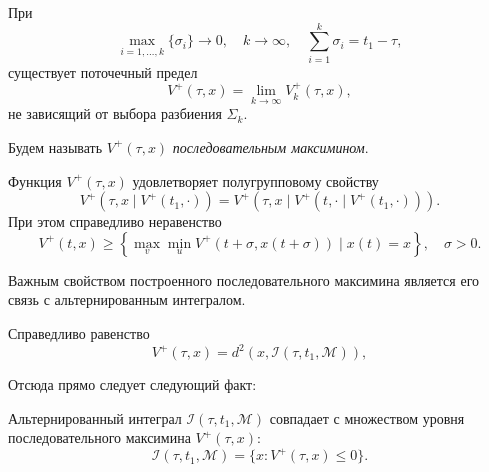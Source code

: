 \begin{lemma}
    При
    \begin{equation*}
        \max_{i = 1,\dots,k} \{\sigma_i\} \to 0, \quad k \to \infty, \quad \sum_{i = 1}^k \sigma_i = 
         t_1 - \tau, 
    \end{equation*}
    существует поточечный предел
    \begin{equation*}
        V^+(\tau, x) = \lim_{k \to \infty} V_k^+(\tau, x),
    \end{equation*}
    не зависящий от выбора разбиения \( \Sigma_k \).
\end{lemma}
Будем называть \( V^+(\tau, x) \) \emph{последовательным максимином}.
\begin{lemma}
    Функция \( V^+(\tau, x) \) удовлетворяет полугрупповому свойству
    \begin{equation*}
        V^+(\tau, x \mid V^+(t_1, \cdot)) = V^+(\tau, x \mid V^+(t, \cdot \mid V^+(t_1, 
         \cdot))).  
    \end{equation*}
    При этом справедливо неравенство
    \begin{equation*}
        V^+(t, x) \ge \left\{ \max_v \min_u V^+(t + \sigma, x(t + \sigma)) \mid x(t) = x 
         \right\}, \quad \sigma > 0.
    \end{equation*}
\end{lemma}
Важным свойством построенного последовательного максимина является его связь с альтернированным
интегралом.
\begin{lemma}
    Справедливо равенство
    \begin{equation*}
        V^+ (\tau, x) = d^2(x, \mathcal{I}(\tau, t_1, \mathcal{M})),
    \end{equation*}
\end{lemma}
Отсюда прямо следует следующий факт:
\begin{lemma}
    Альтернированный интеграл \( \mathcal{I}(\tau, t_1, \mathcal{M}) \) совпадает с
     множеством уровня последовательного максимина \( V^+(\tau, x) \):
    \begin{equation*}
        \mathcal{I}(\tau, t_1, \mathcal{M}) = \{ x : V^+(\tau, x) \le 0 \}.
    \end{equation*}
\end{lemma}

